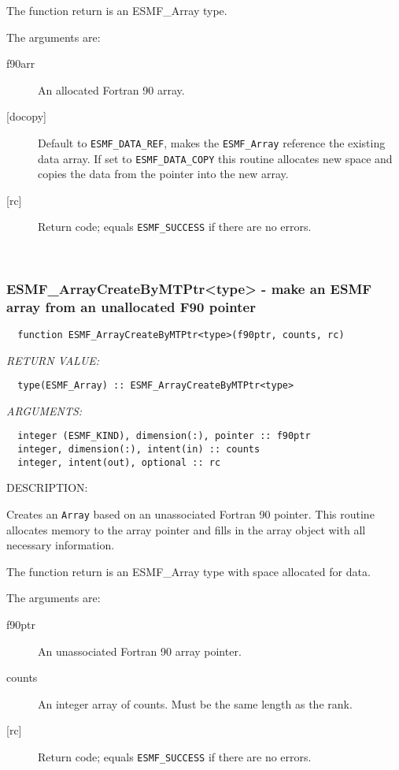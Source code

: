    The function return is an ESMF\_Array type. 
   
   The arguments are: 
   \begin{description} 
   \item[f90arr] 
   An allocated Fortran 90 array. 
   
   \item[{[docopy]}] 
   Default to {\tt ESMF\_DATA\_REF}, makes the {\tt ESMF\_Array} reference 
   the existing data array. If set to {\tt ESMF\_DATA\_COPY} this routine 
   allocates new space and copies the data from the pointer into the 
   new array. 
   
   \item[{[rc]}] 
   Return code; equals {\tt ESMF\_SUCCESS} if there are no errors. 
   \end{description} 
   
  
 
\mbox{}\hrulefill\ 
 
\subsubsection [ESMF\_ArrayCreateByMTPtr<type>] {ESMF\_ArrayCreateByMTPtr<type> - make an ESMF array from an unallocated F90 pointer }


  
\begin{verbatim}  function ESMF_ArrayCreateByMTPtr<type>(f90ptr, counts, rc) 
   \end{verbatim}{\em RETURN VALUE:}
\begin{verbatim}  type(ESMF_Array) :: ESMF_ArrayCreateByMTPtr<type> 
   \end{verbatim}{\em ARGUMENTS:}
\begin{verbatim}  integer (ESMF_KIND), dimension(:), pointer :: f90ptr 
  integer, dimension(:), intent(in) :: counts 
  integer, intent(out), optional :: rc 
   \end{verbatim}
{\sf DESCRIPTION:\\ }

 
   Creates an {\tt Array} based on an unassociated Fortran 90 pointer. 
   This routine allocates memory to the array pointer and fills in 
   the array object with all necessary information. 
   
   The function return is an ESMF\_Array type with space allocated for data. 
   
   The arguments are: 
   \begin{description} 
   \item[f90ptr] 
   An unassociated Fortran 90 array pointer. 
   
   \item[counts] 
   An integer array of counts. Must be the same length as the rank. 
   
   \item[{[rc]}] 
   Return code; equals {\tt ESMF\_SUCCESS} if there are no errors. 
   \end{description} 
   
